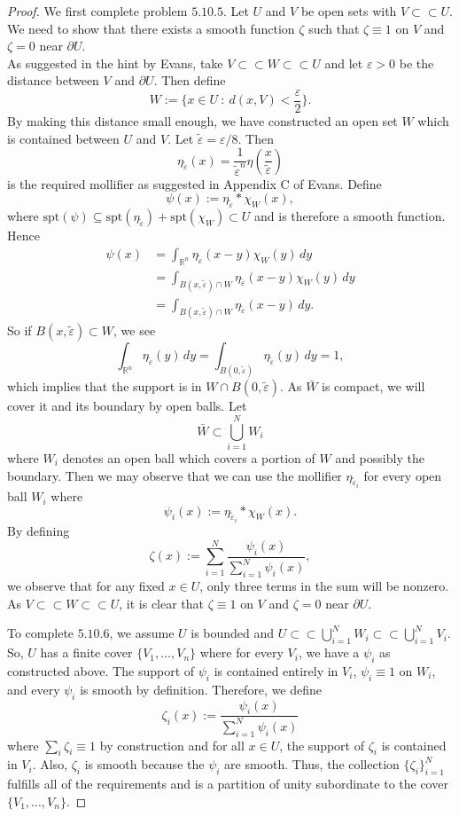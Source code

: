 \documentclass{article}
\begin{document}
\begin{flushleft}
\begin{proof}
We first complete problem $5.10.5$. Let $U$ and $V$ be open sets with $V\subset \subset U$. We need to show that there exists a smooth function $\zeta$ such that $\zeta \equiv 1$ on $V$ and $\zeta=0$ near $\partial U$.
\\
\bigskip
As suggested in the hint by Evans, take $V \subset\subset W \subset\subset U$ and let $\varepsilon >0$ be the distance between $V$ and $\partial U$. Then define
$$W:=\Big\{x\in U~: ~d(x,V) < \frac{\varepsilon}{2}\Big\}.$$
By making this distance small enough, we have constructed an open set $W$ which is contained between $U$ and $V$. Let $\tilde{\varepsilon}=\varepsilon/8$. Then
$$\eta_{\tilde{\varepsilon}}(x)=\frac{1}{\tilde{\varepsilon}^n}\eta\left(\frac{x}{\tilde{\varepsilon}}\right)$$
is the required mollifier as suggested in Appendix C of Evans. Define
$$\psi(x):=\eta_{\tilde{\varepsilon}}\ast \chi_W(x),$$
where $\text{spt}(\psi)\subseteq \text{spt}(\eta_{\tilde{\varepsilon}})+\text{spt}(\chi_W)\subset U$ and is therefore a smooth function. Hence
\begin{align*}
    \psi(x) &= \int_{\mathbb R^n} \eta_{\tilde{\varepsilon}}(x-y) \chi_W(y)\,dy \\&=
    \int_{B(x,\tilde{\varepsilon})\cap W} \eta_{\tilde{\varepsilon}}(x-y) \chi_W(y)\,dy \\&= \int_{B(x,\tilde{\varepsilon})\cap W} \eta_{\tilde{\varepsilon}}(x-y)\,dy.
\end{align*}
So if $B(x,\tilde{\varepsilon})\subset W$, we see 
$$\int_{\mathbb R^n} \eta_{\tilde{\varepsilon}}(y)\,dy = \int_{B(0,\tilde{\varepsilon})}\eta_{\tilde{\varepsilon}}(y)\,dy=1,$$
which implies that the support is in $W\cap B(0,\tilde{\varepsilon})$. As $\bar{W}$ is compact, we will cover it and its boundary by open balls. Let 
$$\bar{W}\subset \bigcup_{i=1}^N W_i$$
where $W_i$ denotes an open ball which covers a portion of $W$ and possibly the boundary. Then we may observe that we can use the mollifier $\eta_{\tilde{\varepsilon}_i}$ for every open ball $W_i$ where
$$\psi_i(x):=\eta_{\tilde{\varepsilon}_i}\ast \chi_W(x).$$
By defining
$$\zeta(x):=\sum_{i=1}^N\frac{\psi_i(x)}{\sum_{i=1}^N \psi_i(x)},$$
we observe that for any fixed $x\in U$, only three terms in the sum will be nonzero. As $V \subset\subset W\subset\subset U$, it is clear that $\zeta \equiv 1$ on $V$ and $\zeta=0$ near $\partial U$.

To complete $5.10.6$, we assume $U$ is bounded and $U \subset \subset  \bigcup_{i=1}^N W_i\subset \subset \bigcup_{i=1}^{N} V_i$. So, $U$ has a finite cover $\{V_1,\ldots,V_n\}$ where for every $V_i$, we have a $\psi_i$ as constructed above. The support of $\psi_i$ is contained entirely in $V_i$, $\psi_i\equiv 1$ on $W_i$, and every $\psi_i$ is smooth by definition. Therefore, we define
$$\zeta_i(x):=\frac{\psi_i(x)}{\sum_{i=1}^N \psi_i(x)}$$
where $\sum_i \zeta_i \equiv 1$ by construction and for all $x\in U$, the support of $\zeta_i$ is contained in $V_i$. Also, $\zeta_i$ is smooth because the $\psi_i$ are smooth. Thus, the collection $\{\zeta_i\}_{i=1}^N$ fulfills all of the requirements and is a partition of unity subordinate to the cover $\{V_1,\ldots,V_n\}$.
 

\end{proof}
\end{flushleft}
\end{document}
